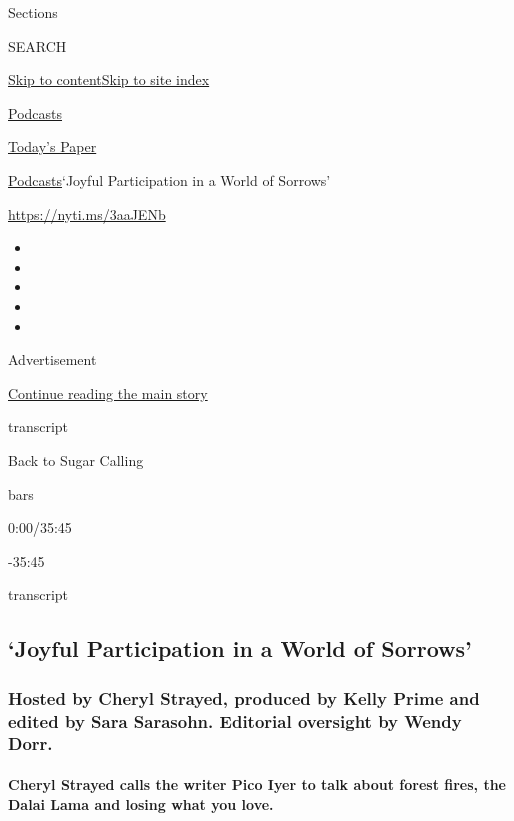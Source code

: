Sections

SEARCH

\protect\hyperlink{site-content}{Skip to
content}\protect\hyperlink{site-index}{Skip to site index}

\href{https://www.nytimes.com/spotlight/podcasts}{Podcasts}

\href{https://myaccount.nytimes.com/auth/login?response_type=cookie\&client_id=vi}{}

\href{https://www.nytimes.com/section/todayspaper}{Today's Paper}

\href{/spotlight/podcasts}{Podcasts}\textbar{}`Joyful Participation in a
World of Sorrows'

\url{https://nyti.ms/3aaJENb}

\begin{itemize}
\item
\item
\item
\item
\item
\end{itemize}

Advertisement

\protect\hyperlink{after-top}{Continue reading the main story}

transcript

Back to Sugar Calling

bars

0:00/35:45

-35:45

transcript

\hypertarget{joyful-participation-in-a-world-of-sorrows}{%
\subsection{`Joyful Participation in a World of
Sorrows'}\label{joyful-participation-in-a-world-of-sorrows}}

\hypertarget{hosted-by-cheryl-strayed-produced-by-kelly-prime-and-edited-by-sara-sarasohn-editorial-oversight-by-wendy-dorr}{%
\subsubsection{Hosted by Cheryl Strayed, produced by Kelly Prime and
edited by Sara Sarasohn. Editorial oversight by Wendy
Dorr.}\label{hosted-by-cheryl-strayed-produced-by-kelly-prime-and-edited-by-sara-sarasohn-editorial-oversight-by-wendy-dorr}}

\hypertarget{cheryl-strayed-calls-the-writer-pico-iyer-to-talk-about-forest-fires-the-dalai-lama-and-losing-what-you-love}{%
\paragraph{Cheryl Strayed calls the writer Pico Iyer to talk about
forest fires, the Dalai Lama and losing what you
love.}\label{cheryl-strayed-calls-the-writer-pico-iyer-to-talk-about-forest-fires-the-dalai-lama-and-losing-what-you-love}}


